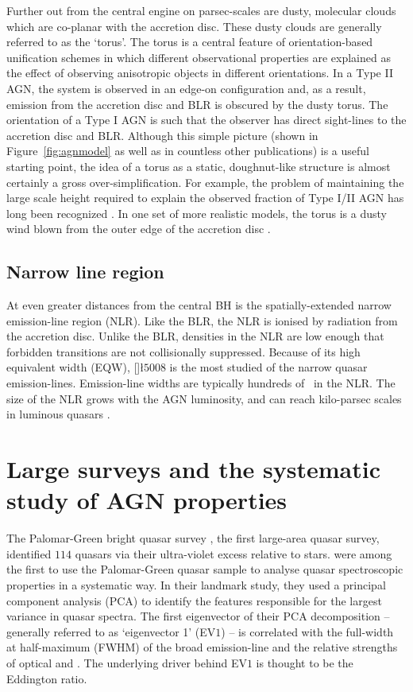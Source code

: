 Further out from the central engine on parsec-scales are dusty, molecular clouds which are co-planar with the accretion disc.
These dusty clouds are generally referred to as the `torus'.
The torus is a central feature of orientation-based unification schemes \citep[e.g.][]{antonucci93} in which different observational properties are explained as the effect of observing anisotropic objects in different orientations.
In a Type II AGN, the system is observed in an edge-on configuration and, as a result, emission from the accretion disc and BLR is obscured by the dusty torus.
The orientation of a Type I AGN is such that the observer has direct sight-lines to the accretion disc and BLR.
Although this simple picture (shown in Figure~\ref{fig:agnmodel} as well as in countless other publications) is a useful starting point, the idea of a torus as a static, doughnut-like structure is almost certainly a gross over-simplification.
For example, the problem of maintaining the large scale height required to explain the observed fraction of Type I/II AGN has long been recognized \citep[e.g.][]{krolik88}.
In one set of more realistic models, the torus is a dusty wind blown from the outer edge of the accretion disc \citep[e.g.][]{konigl94,everett09,gallagher12,everett05,keating12,elitzur06}.

\subsection{Narrow line region}

At even greater distances from the central BH is the spatially-extended narrow emission-line region (NLR).
Like the BLR, the NLR is ionised by radiation from the accretion disc.
Unlike the BLR, densities in the NLR are low enough that forbidden transitions are not collisionally suppressed.
Because of its high equivalent width (EQW), []\l$5008$ is the most studied of the narrow quasar emission-lines.
Emission-line widths are typically hundreds of \kms\, in the NLR.
The size of the NLR grows with the AGN luminosity, and can reach kilo-parsec scales in luminous quasars \citep[e.g.][]{hainline13}.

\section{Large surveys and the systematic study of AGN properties}

The Palomar-Green bright quasar survey \citep{schmidt83}, the first large-area quasar survey, identified $114$ quasars via their ultra-violet excess relative to stars.
\citet{boroson92} were among the first to use the Palomar-Green quasar sample to analyse quasar spectroscopic properties in a systematic way.
In their landmark study, they used a principal component analysis (PCA) to identify the features responsible for the largest variance in quasar spectra.
The first eigenvector of their PCA decomposition -- generally referred to as `eigenvector 1' (EV$1$) -- is correlated with the full-width at half-maximum (FWHM) of the broad \hb emission-line and the relative strengths of optical  and \hbns.
The underlying driver behind EV$1$ is thought to be the Eddington ratio.

